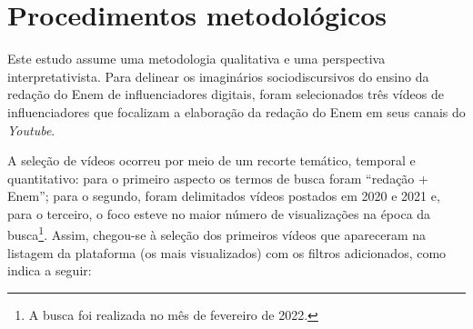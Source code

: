 \documentclass[portuguese]{textolivre}
\begin{document}
\section{Procedimentos metodológicos}\label{sec-formato}
Este estudo assume uma metodologia qualitativa e uma perspectiva interpretativista. Para delinear os imaginários sociodiscursivos do ensino da redação do Enem de influenciadores digitais, foram selecionados três vídeos de influenciadores que focalizam a elaboração da redação do Enem em seus canais do \textit{Youtube}. 

A seleção de vídeos ocorreu por meio de um recorte temático, temporal e quantitativo: para o primeiro aspecto os termos de busca foram “redação + Enem”; para o segundo, foram delimitados vídeos postados em 2020 e 2021 e, para o terceiro, o foco esteve no maior número de visualizações na época da busca\footnote{A busca foi realizada no mês de fevereiro de 2022.}. Assim, chegou-se à seleção dos primeiros vídeos que apareceram na listagem da plataforma (os mais visualizados) com os filtros adicionados, como indica a  seguir:
\end{document}
